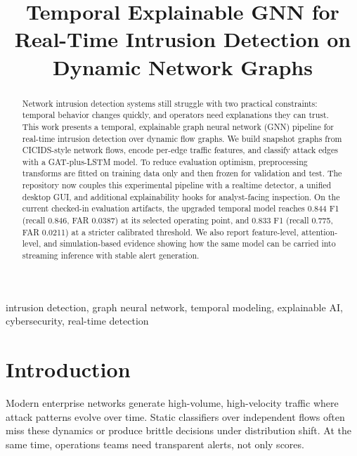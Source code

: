 \documentclass[conference]{IEEEtran}
\begin{document}
\title{Temporal Explainable GNN for Real-Time Intrusion Detection on Dynamic Network Graphs}

\author{%
}

\maketitle

\begin{abstract}
Network intrusion detection systems still struggle with two practical constraints: temporal behavior changes quickly, and operators need explanations they can trust. This work presents a temporal, explainable graph neural network (GNN) pipeline for real-time intrusion detection over dynamic flow graphs. We build snapshot graphs from CICIDS-style network flows, encode per-edge traffic features, and classify attack edges with a GAT-plus-LSTM model. To reduce evaluation optimism, preprocessing transforms are fitted on training data only and then frozen for validation and test. The repository now couples this experimental pipeline with a realtime detector, a unified desktop GUI, and additional explainability hooks for analyst-facing inspection. On the current checked-in evaluation artifacts, the upgraded temporal model reaches 0.844 F1 (recall 0.846, FAR 0.0387) at its selected operating point, and 0.833 F1 (recall 0.775, FAR 0.0211) at a stricter calibrated threshold. We also report feature-level, attention-level, and simulation-based evidence showing how the same model can be carried into streaming inference with stable alert generation.
\end{abstract}

\begin{IEEEkeywords}
intrusion detection, graph neural network, temporal modeling, explainable AI, cybersecurity, real-time detection
\end{IEEEkeywords}

\section{Introduction}
Modern enterprise networks generate high-volume, high-velocity traffic where attack patterns evolve over time. Static classifiers over independent flows often miss these dynamics or produce brittle decisions under distribution shift. At the same time, operations teams need transparent alerts, not only scores.
\end{document}
